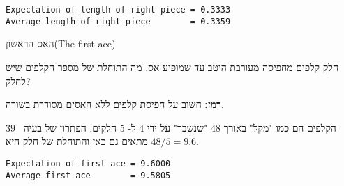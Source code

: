 \sml{}
\begin{verbatim}
Expectation of length of right piece = 0.3333
Average length of right piece        = 0.3359
\end{verbatim}


\begin{prob}{האס הראשון}{}{(The first ace)}

חלק קלפים מחפיסה מעורבת היטב עד שמופיע אס. מה התוחלת של מספר הקלפים שיש לחלק?

\textbf{רמז:}
חשוב על חפיסת קלפים ללא האסים מסודרת בשורה.
\end{prob}

\solution{}
הקלפים הם כמו "מקל" באורך 
$48$
"שנשבר" על ידי 
$4$
ל-%
$5$
חלקים. הפתרון של בעיה%
~$39$
מתאים גם כאן והתוחלת של חלק היא
$48/5=9.6$.

\newpage

\sml{}
\begin{verbatim}
Expectation of first ace = 9.6000
Average first ace        = 9.5805
\end{verbatim}


